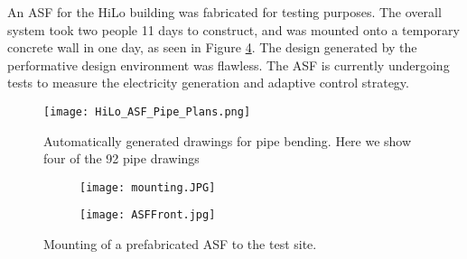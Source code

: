 An ASF for the HiLo building was fabricated for testing purposes. The overall system took two people 11 days to construct, and was mounted onto a temporary concrete wall in one day, as seen in Figure \ref{fig:mounting}. The design generated by the performative design environment was flawless. The ASF is currently undergoing tests to measure the electricity generation and adaptive control strategy. 

\begin{figure}
\begin{center}
\texttt{[image: HiLo\_ASF\_Pipe\_Plans.png]}
\caption{Automatically generated drawings for pipe bending. Here we show four of the 92 pipe drawings}
\label{fig:pipeplans}
\end{center}
\end{figure}

\begin{figure}
    \centering
    \begin{subfigure}[b]{0.47\textwidth}
        \texttt{[image: mounting.JPG]}
        \caption{} 
        \label{fig:mountingCrane}
    \end{subfigure} 
    \begin{subfigure}[b]{0.47\textwidth}
        \texttt{[image: ASFFront.jpg]}
        \caption{}
        \label{fig:mountingFront}
    \end{subfigure}
    \hfill

    \caption{Mounting of a prefabricated ASF to the test site.}
    \label{fig:mounting}
\end{figure}